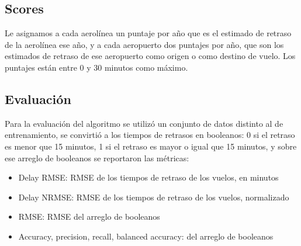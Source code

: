 \subsection{Scores}\label{subsec:scores}
Le asignamos a cada aerol\'inea un puntaje por a\~no que es el estimado de retraso de la aerol\'inea ese a\~no,
 y a cada aeropuerto dos puntajes por a\~no, que son los estimados de retraso de ese aeropuerto
como origen o como destino de vuelo. Los puntajes est\'an entre 0 y 30 minutos como m\'aximo.

\subsection{Evaluaci\'on}\label{subsec:evaluacion}
Para la evaluaci\'on del algoritmo se utiliz\'o un conjunto de datos distinto al de entrenamiento,
se convirti\'o a los tiempos de retrasos en booleanos: 0 si el retraso es menor que 15 minutos, 1 si el retraso
es mayor o igual que 15 minutos, y sobre ese arreglo de booleanos se reportaron las m\'etricas:
\begin{itemize}
 \item Delay RMSE: RMSE de los tiempos de retraso de los vuelos, en minutos
 \item Delay NRMSE: RMSE de los tiempos de retraso de los vuelos, normalizado
 \item RMSE: RMSE del arreglo de booleanos
 \item Accuracy, precision, recall, balanced accuracy: del arreglo de booleanos
\end{itemize}
